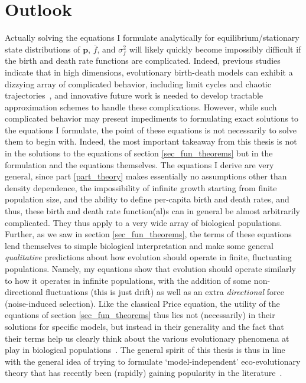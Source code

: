 \section{Outlook}

Actually solving the equations I formulate analytically for equilibrium/stationary state distributions of $\mathbf{p}$, $\overline{f}$, and $\sigma^2_f$ will likely quickly become impossibly difficult if the birth and death rate functions are complicated. Indeed, previous studies indicate that in high dimensions, evolutionary birth-death models can exhibit a dizzying array of complicated behavior, including limit cycles and chaotic trajectories~\citep{doebeli_diversity_2017}, and innovative future work is needed to develop tractable approximation schemes to handle these complications. However, while such complicated behavior may present impediments to formulating exact solutions to the equations I formulate, the point of these equations is not necessarily to solve them to begin with. Indeed, the most important takeaway from this thesis is not in the solutions to the equations of section \ref{sec_fun_theorems} but in the formulation and the equations themselves. The equations I derive are very general, since part \ref{part_theory} makes essentially no assumptions other than density dependence, the impossibility of infinite growth starting from finite population size, and the ability to define per-capita birth and death rates, and thus, these birth and death rate function(al)s can in general be almost arbitrarily complicated. They thus apply to a very wide array of biological populations. Further, as we saw in section \ref{sec_fun_theorems}, the terms of these equations lend themselves to simple biological interpretation and make some general \emph{qualitative} predictions about how evolution should operate in finite, fluctuating populations. Namely, my equations show that evolution should operate similarly to how it operates in infinite populations, with the addition of some non-directional fluctuations (this is just drift) as well as an extra \emph{directional} force (noise-induced selection). Like the classical Price equation, the utility of the equations of section \ref{sec_fun_theorems} thus lies not (necessarily) in their solutions for specific models, but instead in their generality and the fact that their terms help us clearly think about the various evolutionary phenomena at play in biological populations~\citep{frank_natural_2012,luque_one_2017, luque_mirror_2021}. The general spirit of this thesis is thus in line with the general idea of trying to formulate `model-independent' eco-evolutionary theory that has recently been (rapidly) gaining popularity in the literature~\citep{grafen_formal_2014, queller_fundamental_2017, lion_theoretical_2018, allen_mathematical_2019, rice_universal_2020, week_white_2021, wickman_theoretical_2022, kuosmanen_turnover_2022, mazzolini_universality_2022,lion_extending_2023,allen_natural_2023}.

